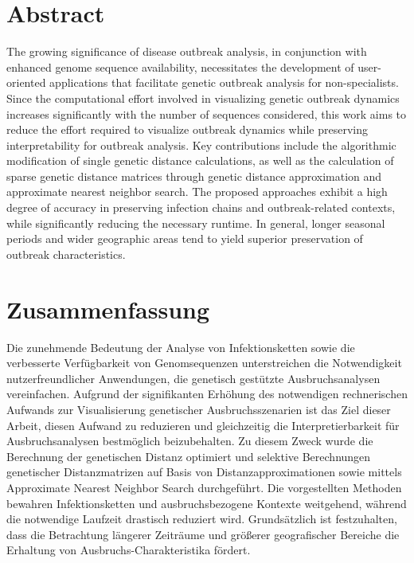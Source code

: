 \section*{Abstract}
The growing significance of disease outbreak analysis, in conjunction with enhanced genome sequence availability, necessitates the development of user-oriented applications that facilitate genetic outbreak analysis for non-specialists. Since the computational effort involved in visualizing genetic outbreak dynamics increases significantly with the number of sequences considered, this work aims to reduce the effort required to visualize outbreak dynamics while preserving interpretability for outbreak analysis. Key contributions include the algorithmic modification of single genetic distance calculations, as well as the calculation of sparse genetic distance matrices through genetic distance approximation and approximate nearest neighbor search. The proposed approaches exhibit a high degree of accuracy in preserving infection chains and outbreak-related contexts, while significantly reducing the necessary runtime. In general, longer seasonal periods and wider geographic areas tend to yield superior preservation of outbreak characteristics.

\section*{Zusammenfassung}
Die zunehmende Bedeutung der Analyse von Infektionsketten sowie die verbesserte Verfügbarkeit von Genomsequenzen unterstreichen die Notwendigkeit nutzerfreundlicher Anwendungen, die genetisch gestützte Ausbruchsanalysen vereinfachen. Aufgrund der signifikanten Erhöhung des notwendigen rechnerischen Aufwands zur Visualisierung genetischer Ausbruchsszenarien ist das Ziel dieser Arbeit, diesen Aufwand zu reduzieren und gleichzeitig die Interpretierbarkeit für Ausbruchsanalysen bestmöglich beizubehalten. Zu diesem Zweck wurde die Berechnung der genetischen Distanz optimiert und selektive Berechnungen genetischer Distanzmatrizen auf Basis von Distanzapproximationen sowie mittels Approximate Nearest Neighbor Search durchgeführt.
Die vorgestellten Methoden bewahren Infektionsketten und ausbruchsbezogene Kontexte weitgehend, während die notwendige Laufzeit drastisch reduziert wird. Grundsätzlich ist festzuhalten, dass die Betrachtung längerer Zeiträume und größerer geografischer Bereiche die Erhaltung von Ausbruchs-Charakteristika fördert.